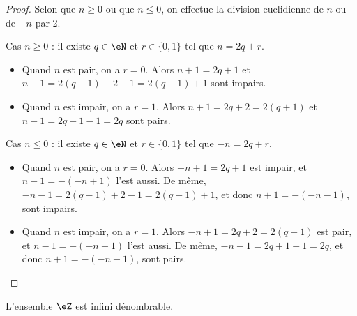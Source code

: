 \begin{proof}
	Selon que \( n \geq 0 \) ou que \( n \leq 0 \), on effectue la division euclidienne de \( n \) ou de \( -n \) par 2.
	\begin{subproof}
		\item[Cas \( n \geq 0 \)]: il existe \( q \in \eN \) et \( r \in \{ 0, 1\} \) tel que \( n = 2q+r \).
		\begin{itemize}
			\item
			      Quand \( n \) est pair, on a \( r = 0 \). Alors \( n+1 = 2q + 1 \) et \( n - 1 = 2(q-1) + 2 - 1 =  2(q-1) + 1 \) sont impairs.
			\item
			      Quand \( n \) est impair, on a \( r = 1 \). Alors \( n+1 = 2q + 2 = 2(q+1) \) et \( n - 1 = 2q + 1 - 1 =  2q \) sont pairs.
		\end{itemize}
		\item[Cas \( n \leq 0 \)]: il existe \( q \in \eN \) et \( r \in \{ 0, 1\} \) tel que \( -n = 2q+r \).
		\begin{itemize}
			\item
			      Quand \( n \) est pair, on a \( r = 0 \). Alors \( -n+1 = 2q + 1 \) est impair, et \( n-1 = -(-n+1) \) l'est aussi. De même, \( -n - 1 = 2(q-1) + 2 - 1 =  2(q-1) + 1 \), et donc \( n+1 = -(-n-1) \), sont impairs.
			\item
			      Quand \( n \) est impair, on a \( r = 1 \). Alors \( -n+1 = 2q + 2 = 2(q+1) \) est pair, et \( n-1 = -(-n+1) \) l'est aussi. De même, \( -n - 1 = 2q + 1 - 1 =  2q \), et donc \( n+1 = -(-n-1) \), sont pairs.
		\end{itemize}
	\end{subproof}
\end{proof}

\begin{lemma}       \label{LEMooJNXIooBmdOVi}
	L'ensemble \( \eZ\) est infini dénombrable.
\end{lemma}

